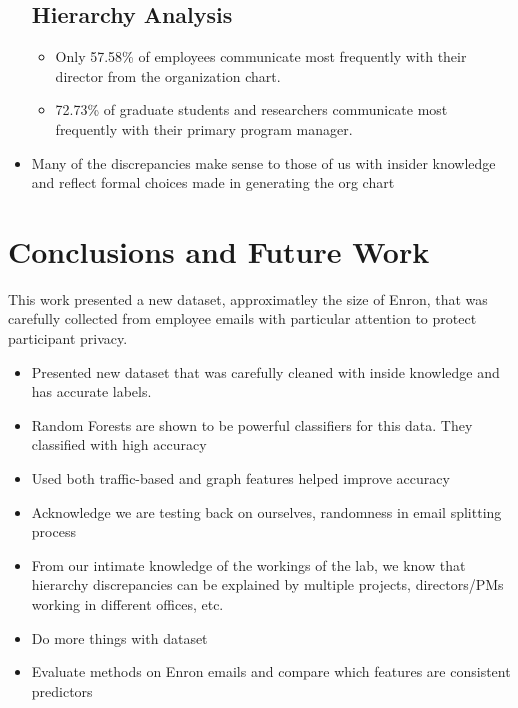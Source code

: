 \documentclass{article}
\begin{document}
\begin{itemize}
\subsection{Hierarchy Analysis}
    \begin{itemize}
    \item Only 57.58\% of employees communicate most frequently with their director from the organization chart.
    \item 72.73\% of graduate students and researchers communicate most frequently with their primary program manager.
    \end{itemize}
\item Many of the discrepancies make sense to those of us with insider knowledge and reflect formal choices made in generating the org chart

\end{itemize}



\section{Conclusions and Future Work} \label{Conclusions}
This work presented a new dataset, approximatley the size of Enron, that was carefully collected from employee emails with particular attention to protect participant privacy.

\begin{itemize}
\item Presented new dataset that was carefully cleaned with inside knowledge and has accurate labels.
\item Random Forests are shown to be powerful classifiers for this data.  They classified with high accuracy
\item Used both traffic-based and graph features helped improve accuracy
\item Acknowledge we are testing back on ourselves, randomness in email splitting process
\item From our intimate knowledge of the workings of the lab, we know that hierarchy discrepancies can be explained by multiple projects, directors/PMs working in different offices, etc.
\item Do more things with dataset
\item Evaluate methods on Enron emails and compare which features are consistent predictors
\end{itemize}

\clearpage


\end{document}
